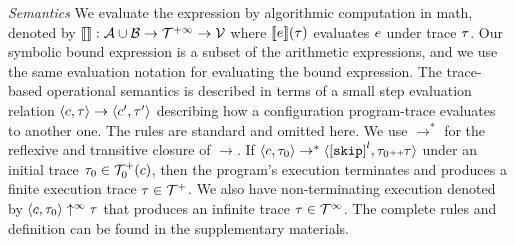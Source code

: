 \emph{Semantics}
We evaluate the expression by algorithmic computation in math, denoted by
$\llbracket  \rrbracket : \mathcal{A} \cup \mathcal{B} \to \mathcal{T}^{+\infty} \to \mathcal{V}$ where
$\llbracket e \rrbracket(\mathtt{\tau})$ evaluates $e$ under trace $\mathtt{\tau}$.
Our symbolic bound expression is a subset of the arithmetic expressions, and we use the same evaluation notation for evaluating the bound expression.
The trace-based operational semantics is described in terms of a small step evaluation relation $\langle c, \mathtt{\tau} \rangle \to \langle c', \mathtt{\tau}' \rangle$ describing how a configuration program-trace evaluates to another
one.
The rules are standard and omitted here.
We use $\to^*$ for the reflexive and transitive closure of $\to$. 
If $\config{c, \trace_0} \rightarrow^{*} \config{\clabel{\eskip}^l, \trace_0 \tracecat \trace}$ under an initial trace 
$\mathtt{\tau}_0 \in \mathcal{T}^{+}_0(c)$,
then the program's execution terminates and produces a finite execution trace $\mathtt{\tau} \in \mathcal{T}^{+}$. We also have non-terminating execution denoted by $\langle c, \mathtt{\tau}_0 \rangle \uparrow^{\infty} \mathtt{\tau}$ that produces an infinite trace $\mathtt{\tau} \in \mathcal{T}^{\infty}$. The complete rules and definition can be found in the supplementary materials.
